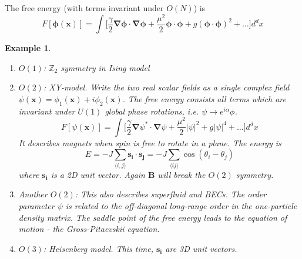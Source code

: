 \documentclass[a4paper]{article}
\newtheorem{eg}{Example}[section]
\theoremstyle{new}
\begin{document}
The free energy (with terms invariant under $O(N)$) is
$$F[\boldsymbol{\phi}(\mathbf{x})]=\int\bigg[\frac{\gamma}{2}\boldsymbol{\nabla}\boldsymbol{\phi}\cdot\boldsymbol{\nabla}\boldsymbol{\phi}+\frac{\mu^2}{2}\boldsymbol{\phi}\cdot\boldsymbol{\phi}+g(\boldsymbol{\phi}\cdot\boldsymbol{\phi})^2+\dots\bigg]d^dx$$
\begin{eg}\leavevmode
\begin{enumerate}
    \item $O(1)$: $\mathbb{Z}_2$ symmetry in Ising model
    \item $O(2)$: XY-model. Write the two real scalar fields as a single complex field $\psi(\mathbf{x})=\phi_1(\mathbf{x})+i\phi_2(\mathbf{x})$. The free energy consists all terms which are invariant under $U(1)$ global phase rotations, i.e. $\psi\rightarrow e^{i\alpha}\phi$. 
    $$F[\psi(\mathbf{x})]=\int\bigg[\frac{\gamma}{2}\boldsymbol{\nabla}\psi^*\cdot\boldsymbol{\nabla}\psi+\frac{\mu^2}{2}|\psi|^2+g|\psi|^4+\dots\bigg]d^dx$$
    It describes magnets when spin is free to rotate in a plane. The energy is 
    $$E=-J\sum_{\langle i,j\rangle}\mathbf{s_i}\cdot\mathbf{s_j}=-J\sum_{\langle ij\rangle}\cos(\theta_i-\theta_j)$$
    where $\mathbf{s_i}$ is a 2D unit vector. Again $\mathbf{B}$ will break the $O(2)$ symmetry.
    \item Another $O(2)$: This also describes superfluid and BECs. The order parameter $\psi$ is related to the off-diagonal long-range order in the one-particle density matrix. The saddle point of the free energy leads to the equation of motion - the Gross-Pitaevskii equation.
    \item $O(3)$: Heisenberg model. This time, $\mathbf{s_i}$ are 3D unit vectors.
\end{enumerate}
\end{eg}
\end{document}
